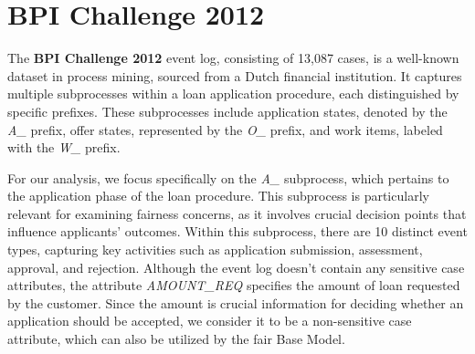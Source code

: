 
\section{BPI Challenge 2012}
The \textbf{BPI Challenge 2012} \cite{bpi_2012} event log, consisting of 13,087 cases, is a well-known dataset in process mining,
sourced from a Dutch financial institution.
It captures multiple subprocesses within a loan application procedure, each distinguished by specific prefixes.
These subprocesses include application states, denoted by the \textit{A\_} prefix, offer states, represented by the \textit{O\_} prefix,
and work items, labeled with the \textit{W\_} prefix.

For our analysis, we focus specifically on the \textit{A\_} subprocess, which pertains to the application phase of the loan procedure.
This subprocess is particularly relevant for examining fairness concerns,
as it involves crucial decision points that influence applicants' outcomes.
Within this subprocess, there are 10 distinct event types,
capturing key activities such as application submission, assessment, approval, and rejection.
Although the event log doesn't contain any sensitive case attributes,
the attribute \textit{AMOUNT\_REQ} specifies the amount of loan requested by the customer.
Since the amount is crucial information for deciding whether an application should be accepted,
we consider it to be a non-sensitive case attribute, which can also be utilized by the fair Base Model.

